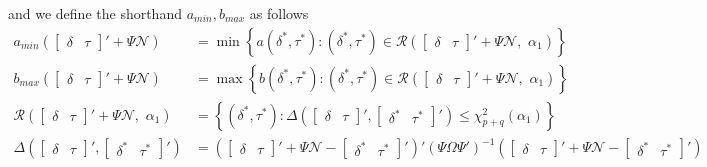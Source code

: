 \documentclass[11pt]{article}
\begin{document}
and we define the shorthand $a_{min}, b_{max}$ as follows
\begin{align*}
a_{min}\left( \begin{bmatrix}
\delta & \tau
\end{bmatrix}' + \Psi \mathscr{N} \right) &= \min\left \{ a(\delta^{*}, \tau^{*}): (\delta^{*}, \tau^{*}) \in \mathscr{R} \left( \begin{bmatrix}
\delta & \tau
\end{bmatrix}' + \Psi \mathscr{N}, \,\, \alpha_1 \right)  \right \}\\
b_{max}\left( \begin{bmatrix}
\delta & \tau
\end{bmatrix}' + \Psi \mathscr{N} \right) &= \max\left \{ b(\delta^{*}, \tau^{*}): (\delta^{*}, \tau^{*}) \in \mathscr{R} \left( \begin{bmatrix}
\delta & \tau
\end{bmatrix}' + \Psi \mathscr{N}, \,\, \alpha_1 \right)  \right \}\\
\mathscr{R}\left( \begin{bmatrix}
\delta & \tau
\end{bmatrix}' + \Psi \mathscr{N}, \,\, \alpha_1 \right ) &= \left \{ (\delta^{*}, \tau^{*}): \Delta \left( \begin{bmatrix}
\delta & \tau
\end{bmatrix}', \begin{bmatrix}
\delta^{*} & \tau^{*}
\end{bmatrix}' \right) \leq \chi_{p+q}^2(\alpha_1) \right \}\\
\Delta \left( \begin{bmatrix}
\delta & \tau
\end{bmatrix}', \begin{bmatrix}
\delta^{*} & \tau^{*}
\end{bmatrix}' \right)& = \left( \begin{bmatrix}
\delta & \tau
\end{bmatrix}' + \Psi \mathscr{N} - \begin{bmatrix}
\delta^{*} & \tau^{*}
\end{bmatrix}' \right)' (\Psi\Omega\Psi')^{-1}\left( \begin{bmatrix}
\delta & \tau
\end{bmatrix}' + \Psi \mathscr{N} - \begin{bmatrix}
\delta^{*} & \tau^{*}
\end{bmatrix}' \right)
\end{align*}
\end{document}

